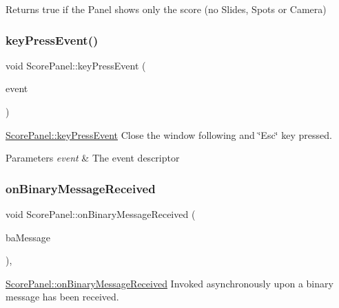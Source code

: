 \begin{DoxyReturn}{Returns}
true if the Panel shows only the score (no Slides, Spots or Camera) 
\end{DoxyReturn}
\mbox{\label{classScorePanel_a21276568d4ca7a413087b59d7b5a39cc}} 
\subsubsection{\texorpdfstring{key\+Press\+Event()}{keyPressEvent()}}
{\footnotesize\ttfamily void Score\+Panel\+::key\+Press\+Event (\begin{DoxyParamCaption}\item[{Q\+Key\+Event $\ast$}]{event }\end{DoxyParamCaption})}



\mbox{\hyperlink{classScorePanel_a21276568d4ca7a413087b59d7b5a39cc}{Score\+Panel\+::key\+Press\+Event}} Close the window following and \char`\"{}\+Esc\char`\"{} key pressed. 


\begin{DoxyParams}{Parameters}
{\em event} & The event descriptor \\
\hline
\end{DoxyParams}
\mbox{\label{classScorePanel_a2588d1e54b9c669ea352bab4215bef42}} 
\subsubsection{\texorpdfstring{on\+Binary\+Message\+Received}{onBinaryMessageReceived}}
{\footnotesize\ttfamily void Score\+Panel\+::on\+Binary\+Message\+Received (\begin{DoxyParamCaption}\item[{Q\+Byte\+Array}]{ba\+Message }\end{DoxyParamCaption})\hspace{0.3cm}{\ttfamily [protected]}, {\ttfamily [slot]}}



\mbox{\hyperlink{classScorePanel_a2588d1e54b9c669ea352bab4215bef42}{Score\+Panel\+::on\+Binary\+Message\+Received}} Invoked asynchronously upon a binary message has been received. 


